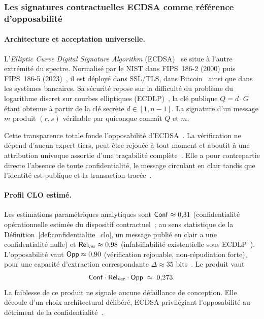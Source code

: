 \subsubsection{Les signatures contractuelles ECDSA comme r\'ef\'erence d'opposabilit\'e}
\label{subsubsec:cas_ecdsa}
\begin{sloppypar}

\paragraph{Architecture et acceptation universelle.}
\label{par:ecdsa_architecture}

L'\emph{Elliptic Curve Digital Signature Algorithm} (ECDSA)~\cite{Johnson01}
se situe \`a l'autre extr\'emit\'e du spectre. Normalis\'e par le NIST dans FIPS~186-2 (2000) puis FIPS~186-5 (2023)~\cite{NIST.FIPS.186-5},
il est d\'eploy\'e dans SSL/TLS, dans Bitcoin~\cite{Nakamoto08,Narayanan16} ainsi que dans
les syst\`emes bancaires. Sa s\'ecurit\'e repose sur la difficult\'e du probl\`eme du logarithme discret sur
courbes elliptiques (ECDLP)~\cite{RFC6090,RFC6979}, la cl\'e publique $Q = d \cdot G$
\'etant obtenue \`a partir de la cl\'e secr\`ete $d \in [1, n-1]$. La signature d'un message $m$ produit
$(r, s)$ v\'erifiable par quiconque conna\^it $Q$ et $m$.

Cette transparence totale fonde l'opposabilit\'e d'ECDSA~\cite{ESIGN00,eIDAS14}. La
v\'erification ne d\'epend d'aucun expert tiers, peut \^etre rejou\'ee \`a tout moment et
aboutit \`a une attribution univoque assortie d'une tra\c{c}abilit\'e compl\`ete~\cite{Sasson14}.
Elle a pour contrepartie directe l'absence de toute confidentialit\'e, le message
circulant en clair tandis que l'identit\'e est publique et la transaction trac\'ee~\cite{Androulaki13,ECDSA-Fails}.

\paragraph{Profil CLO estim\'e.}
\label{par:ecdsa_clo}

Les estimations param\'etriques analytiques sont
$\mathsf{Conf} \approx 0{,}31$ (confidentialit\'e op\'erationnelle estim\'ee du dispositif contractuel~; au sens statistique de la D\'efinition~\ref{def:confidentialite_clo}, un message publi\'e en clair a une confidentialit\'e nulle) et
$\mathsf{Rel}_{\mathrm{ver}} \approx 0{,}98$ (infalsifiabilit\'e existentielle sous ECDLP~\cite{GoldwasserMicali84,GMR88}).
L'opposabilit\'e vaut $\mathsf{Opp} \approx 0{,}90$ (v\'erification rejouable, non-r\'epudiation forte),
pour une capacit\'e d'extraction correspondante $\Delta \approx 35$ bits~\cite{MINKA2026CRO}.
Le produit vaut
\begin{equation}
\mathsf{Conf} \cdot \mathsf{Rel}_{\mathrm{ver}} \cdot \mathsf{Opp} \;\approx\; 0{,}273.
\label{eq:ecdsa_cro}
\end{equation}
La faiblesse de ce produit ne signale aucune d\'efaillance de conception.
Elle d\'ecoule d'un choix architectural d\'elib\'er\'e, ECDSA privil\'egiant
l'opposabilit\'e au d\'etriment de la confidentialit\'e~\cite{BonehFranklin}.

\end{sloppypar}

